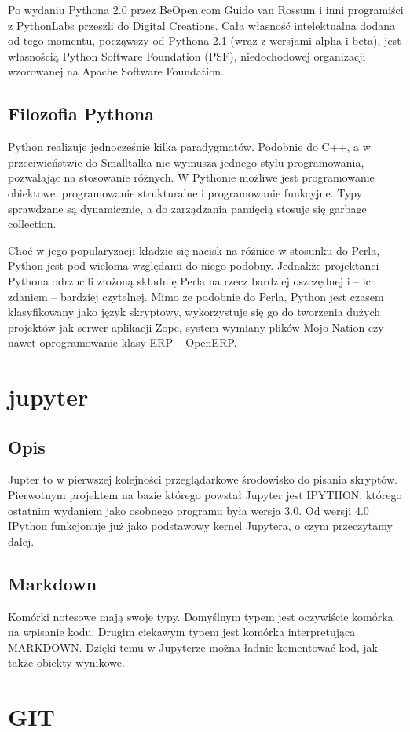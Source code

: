 \documentclass{article}
\begin{document}
Po wydaniu Pythona 2.0 przez BeOpen.com Guido van Rossum i inni programiści z PythonLabs przeszli do Digital Creations. Cała własność intelektualna dodana od tego momentu, począwszy od Pythona 2.1 (wraz z wersjami alpha i beta), jest własnością Python Software Foundation (PSF), niedochodowej organizacji wzorowanej na Apache Software Foundation.
 \subsection{Filozofia Pythona} 
 Python realizuje jednocześnie kilka paradygmatów. Podobnie do C++, a w przeciwieństwie do Smalltalka nie wymusza jednego stylu programowania, pozwalając na stosowanie różnych. W Pythonie możliwe jest programowanie obiektowe, programowanie strukturalne i programowanie funkcyjne. Typy sprawdzane są dynamicznie, a do zarządzania pamięcią stosuje się garbage collection.

Choć w jego popularyzacji kładzie się nacisk na różnice w stosunku do Perla, Python jest pod wieloma względami do niego podobny. Jednakże projektanci Pythona odrzucili złożoną składnię Perla na rzecz bardziej oszczędnej i – ich zdaniem – bardziej czytelnej. Mimo że podobnie do Perla, Python jest czasem klasyfikowany jako język skryptowy, wykorzystuje się go do tworzenia dużych projektów jak serwer aplikacji Zope, system wymiany plików Mojo Nation czy nawet oprogramowanie klasy ERP – OpenERP.
 \newpage
\section{jupyter}
\subsection{Opis}
Jupter to w pierwszej kolejności przeglądarkowe środowisko do pisania skryptów. Pierwotnym projektem na bazie którego powstał Jupyter jest IPYTHON, którego ostatnim wydaniem jako osobnego programu była wersja 3.0. Od wersji 4.0 IPython funkcjonuje już jako podstawowy kernel Jupytera, o czym przeczytamy dalej.
\subsection{Markdown}
Komórki notesowe mają swoje typy. Domyślnym typem jest oczywiście komórka na wpisanie kodu. Drugim ciekawym typem jest komórka interpretująca MARKDOWN. Dzięki temu w Jupyterze można ładnie komentować kod, jak także obiekty wynikowe.
\newpage
\section{GIT}
\end{document}
